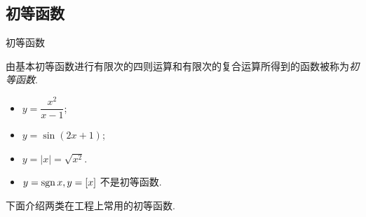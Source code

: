 \subsection{初等函数}

\begin{frame}{初等函数}
	\onslide<+->
	\begin{definition}
		由基本初等函数进行有限次的四则运算和有限次的复合运算所得到的函数被称为\emph{初等函数}.
	\end{definition}
	\onslide<+->
	\begin{example}
		\begin{itemize}
			\item $y=\dfrac{x^2}{x-1}$;
			\item $y=\sin(2x+1)$;
			\item $y=|x|=\sqrt{x^2}$.
			\item $y=\operatorname{sgn} x, y=[x]$ 不是初等函数.
		\end{itemize}
	\end{example}
	\onslide<+->
	下面介绍两类在工程上常用的初等函数.
\end{frame}


